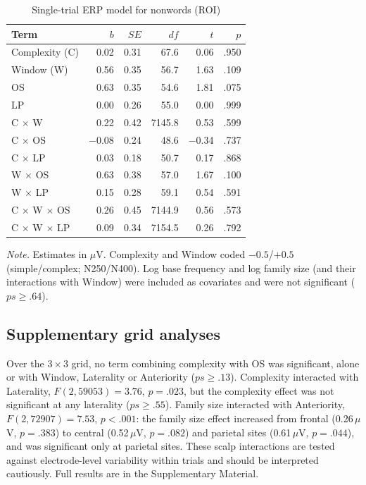 \begin{table}[htbp]
\centering
\caption{Single-trial ERP model for nonwords (ROI)}
\label{tab:nonwords}
\begin{tabular}{lrrrrr}
\toprule
Term & $b$ & $SE$ & $df$ & $t$ & $p$ \\
\midrule
Complexity (C)                    &  0.02 & 0.31 &   67.6 &  0.06 & .950 \\
Window (W)                        &  0.56 & 0.35 &   56.7 &  1.63 & .109 \\
OS                                &  0.63 & 0.35 &   54.6 &  1.81 & .075 \\
LP                                &  0.00 & 0.26 &   55.0 &  0.00 & .999 \\
C $\times$ W                      &  0.22 & 0.42 & 7145.8 &  0.53 & .599 \\
C $\times$ OS                     & $-$0.08 & 0.24 &   48.6 & $-$0.34 & .737 \\
C $\times$ LP                     &  0.03 & 0.18 &   50.7 &  0.17 & .868 \\
W $\times$ OS                     &  0.63 & 0.38 &   57.0 &  1.67 & .100 \\
W $\times$ LP                     &  0.15 & 0.28 &   59.1 &  0.54 & .591 \\
C $\times$ W $\times$ OS          &  0.26 & 0.45 & 7144.9 &  0.56 & .573 \\
C $\times$ W $\times$ LP          &  0.09 & 0.34 & 7154.5 &  0.26 & .792 \\
\bottomrule
\end{tabular}

\vspace{2pt}
\begin{minipage}{0.75\linewidth}\footnotesize
\textit{Note.} Estimates in $\mu$V. Complexity and Window coded $-0.5$/$+0.5$
(simple/complex; N250/N400). Log base frequency and log family size (and their
interactions with Window) were included as covariates and were not significant
($ps \geq .64$).
\end{minipage}
\end{table}

\subsection{Supplementary grid analyses}
Over the $3 \times 3$ grid, no term combining complexity with OS was significant,
alone or with Window, Laterality or Anteriority ($ps \geq .13$). Complexity
interacted with Laterality, $F(2, 59053) = 3.76$, $p = .023$, but the complexity
effect was not significant at any laterality ($ps \geq .55$). Family size
interacted with Anteriority, $F(2, 72907) = 7.53$, $p < .001$: the family size
effect increased from frontal (0.26\,$\mu$V, $p = .383$) to central
(0.52\,$\mu$V, $p = .082$) and parietal sites (0.61\,$\mu$V, $p = .044$), and
was significant only at parietal sites. These scalp interactions are tested against
electrode-level variability within trials and should be interpreted cautiously.
Full results are in the Supplementary Material.
